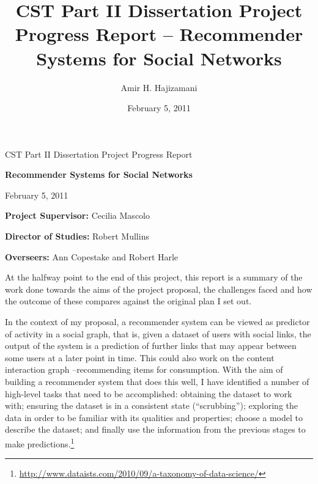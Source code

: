 \documentclass[a4paper,11pt,titlepage]{article}
\title{CST Part II Dissertation Project Progress Report -- Recommender Systems for Social Networks}
\author{Amir H. Hajizamani}
\date{February 5, 2011}
\begin{document}
\begin{titlepage}
\medskip
{}
\medskip
{}

\vfill

\centerline{\large CST Part II Dissertation Project Progress Report}
\vspace{0.4in}
\centerline{\Large\bf Recommender Systems for Social Networks}
\vspace{0.3in}
\centerline{\large{February 5, 2011}}

\vfill

{\bf Project Supervisor:} Cecilia Mascolo

\vspace{0.2in}

{\bf Director of Studies:} Robert Mullins

\vspace{0.2in}

{\bf Overseers:} Ann Copestake and Robert Harle

\vspace{0.2in}

\end{titlepage}

At the halfway point to the end of this project, this report is a summary of the work done towards the aims of the project proposal, the challenges faced and how the outcome of these compares against the original plan I set out.

In the context of my proposal, a recommender system can be viewed as predictor of activity in a social graph, that is, given a dataset of users with social links, the output of the system is a prediction of further links that may appear between some users at a later point in time. This could also work on the content interaction graph --recommending items for consumption. With the aim of building a recommender system that does this well, I have identified a number of high-level tasks that need to be accomplished: obtaining the dataset to work with; ensuring the dataset is in a consistent state (``scrubbing''); exploring the data in order to be familiar with its qualities and properties; choose a model to describe the dataset; and finally use the information from the previous stages to make predictions.\footnote{\url{http://www.dataists.com/2010/09/a-taxonomy-of-data-science/}}
\end{document}
